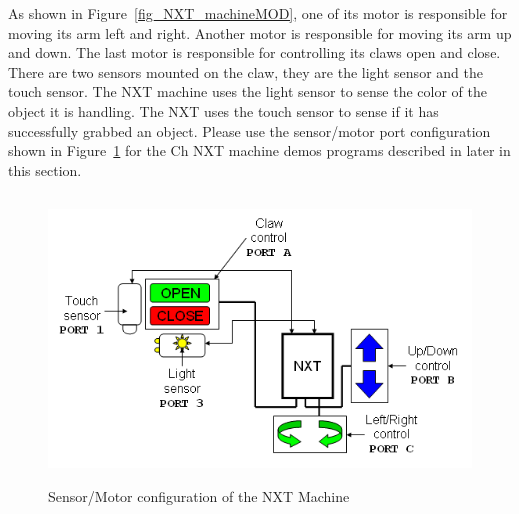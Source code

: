 \documentclass[11pt]{article}
\begin{document}
As shown in Figure~\ref{fig_NXT_machineMOD}, one of its motor is responsible for 
moving its arm left and right. Another motor is responsible for moving its arm 
up and down. The last motor is responsible for controlling its claws open and 
close. There are two sensors mounted on the claw, they are the light sensor and 
the touch sensor. The NXT machine uses the light sensor to sense the color of the 
object it is handling. The NXT uses the touch sensor to sense if it has successfully 
grabbed an object. Please use the sensor/motor port configuration shown in 
Figure~\ref{fig_NXT_mach_port} for the Ch NXT machine demos programs described in 
later in this section.
\begin{figure}[H]
  \begin{center}
    \includegraphics[height=3in]{figure/mindstorm/NXT_mach_port.png}
    \caption{Sensor/Motor configuration of the NXT Machine\label{fig_NXT_mach_port}}
  \end{center}
\end{figure}

\newpage
\end{document}
